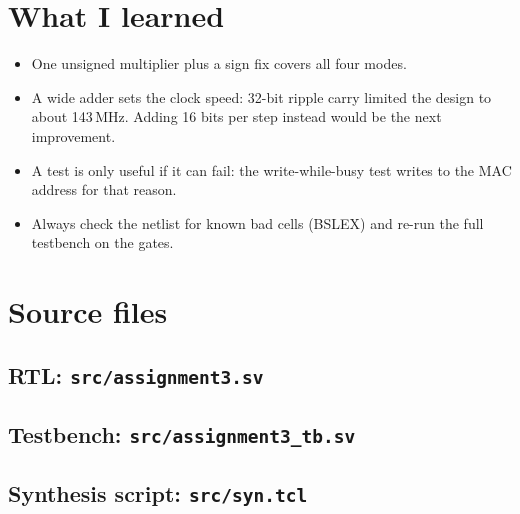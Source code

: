 \documentclass[11pt,a4paper]{article}
\begin{document}
\section{What I learned}
\begin{itemize}
\item One unsigned multiplier plus a sign fix covers all four modes.
\item A wide adder sets the clock speed: 32-bit ripple carry limited the design to about 143\,MHz.
      Adding 16 bits per step instead would be the next improvement.
\item A test is only useful if it can fail: the write-while-busy test writes to the MAC address for that reason.
\item Always check the netlist for known bad cells (BSLEX) and re-run the full testbench on the gates.
\end{itemize}

\appendix
\section{Source files}
\subsection*{RTL: \texttt{src/assignment3.sv}}

\subsection*{Testbench: \texttt{src/assignment3\_tb.sv}}

\subsection*{Synthesis script: \texttt{src/syn.tcl}}

\end{document}
